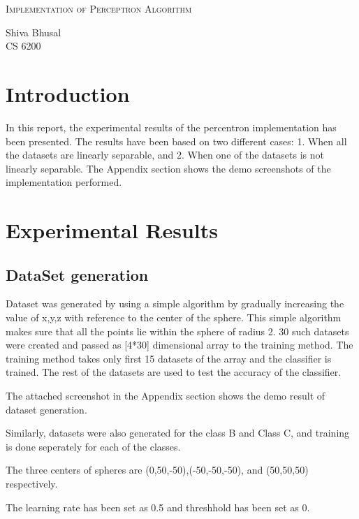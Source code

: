 \documentclass[letterpaper]{article}
\newcommand{\reporttitle}{Implementation of Perceptron Algorithm}
\newcommand{\name}{Shiva Bhusal}
\newcommand{\course}{CS 6200}
\begin{document}
\begin{center}{\huge \scshape \reporttitle}\end{center}
\begin{center}\vspace{0.2em} {\Large \name\\}
  {\course}\end{center}
  
  
  \section{Introduction}
  In this report, the experimental results of the percentron implementation has been presented. The results have been based on two different cases: 1. When all the datasets are linearly separable, and 2. When one of the datasets is not linearly separable. The Appendix section shows the demo screenshots of the implementation performed. 

  \section {Experimental Results}
  \subsection {DataSet generation}
  Dataset was generated by using a simple algorithm by gradually increasing the value of x,y,z with reference to the center of the sphere. This simple algorithm makes sure that all the points lie within the sphere of radius 2. 30 such datasets were created and passed as [4*30] dimensional array to the training method. The training method takes only first 15 datasets of the array and the classifier is trained. The rest of the datasets are used to test the accuracy of the classifier. 

  The attached screenshot in the Appendix section shows the demo result of dataset generation. 
  
  Similarly, datasets were also generated for the class B and Class C, and training is done seperately for each of the classes. 

  The three centers of spheres are (0,50,-50),(-50,-50,-50), and (50,50,50) respectively. 

  The learning rate has been set as 0.5 and threshhold has been set as 0. 
\end{document}
